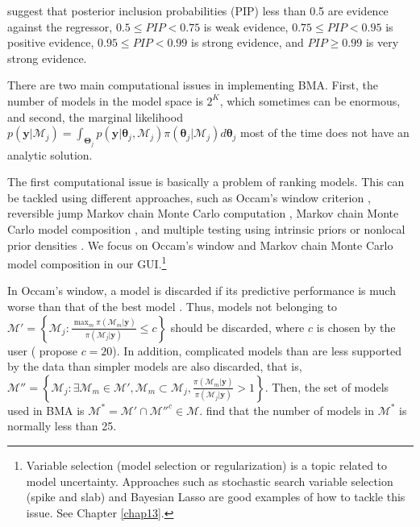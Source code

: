 \cite{Kass1995} suggest that posterior inclusion probabilities (PIP) less than 0.5 are evidence against the regressor, $0.5\leq PIP<0.75$ is weak evidence, $0.75\leq PIP<0.95$ is positive evidence, $0.95\leq PIP<0.99$ is strong evidence, and $PIP\geq 0.99$ is very strong evidence.

There are two main computational issues in implementing BMA. First, the number of models in the model space is $2^K$, which sometimes can be enormous, and second, the marginal likelihood $p(\bm{y} | \mathcal{M}_j)=\int_{\bm{\Theta}_j} p(\bm{y}| \bm{\theta}_j,\mathcal{M}_j)\pi(\bm{\theta}_j | \mathcal{M}_j) d\bm{\theta}_{j}$ most of the time does not have an analytic solution. 

The first computational issue is basically a problem of ranking models. This can be tackled using different approaches, such as Occam's window criterion \cite{Madigan1994,Raftery1997}, reversible jump Markov chain Monte Carlo computation \cite{Green1995}, Markov chain Monte Carlo model composition \cite{madigan95}, and multiple testing using intrinsic priors \cite{Casella2006} or nonlocal prior densities \cite{Johnson2012}. We focus on Occam's window and Markov chain Monte Carlo model composition in our GUI.\footnote{Variable selection (model selection or regularization) is a topic related to model uncertainty. Approaches such as stochastic search variable selection (spike and slab) \cite{George1993,George1997} and Bayesian Lasso \cite{Park2008} are good examples of how to tackle this issue. See Chapter \ref{chap13}.}

In Occam's window, a model is discarded if its predictive performance is much worse than that of the best model  \cite{Madigan1994,Raftery1997}.
Thus, models not belonging to $\mathcal{M}'=\left\{\mathcal{M}_j:\frac{\max_m {\pi(\mathcal{M}_m|\bm{y})}}{\pi(\mathcal{M}_j|\bm{y})}\leq c\right\}$ should be discarded, where $c$ is chosen by the user (\cite{Madigan1994} propose $c=20$).
In addition, complicated models than are less supported by the data than simpler models are also discarded, that is, $\mathcal{M}''=\left\{\mathcal{M}_j:\exists \mathcal{M}_m\in\mathcal{M}',\mathcal{M}_m\subset \mathcal{M}_j,\frac{\pi(\mathcal{M}_m|\bm{y})}{\pi(\mathcal{M}_j|\bm{y})}>1\right\}$. Then, the set of models used in BMA is $\mathcal{M}^*=\mathcal{M}'\cap \mathcal{M}''^c\in\mathcal{M}$. \cite{Raftery1997} find that the number of models in $\mathcal{M}^*$ is normally less than 25.

